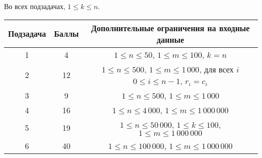 Во всех подзадачах, $1 \le k \le n$.

\begin{center}
\renewcommand{\arraystretch}{1.5}
\begin{tabular}{|c|c|c|}
\hline
Подзадача & Баллы & Дополнительные ограничения на входные данные\\
\hline
1 & 4 & $1 \le n \le 50$, $1 \le m \le 100$, $k = n$ \\
\hline
2 & 12 & $1 \le n \le 500$, $1 \le m \le 1\,000$, для всех $i$ $0 \le i \le n - 1$, $r_i = c_i$ \\
\hline
3 & 9 & $1 \le n \le 500$, $1 \le m \le 1\,000$ \\
\hline
4 & 16 & $1 \le n \le 4\,000$, $1 \le m \le 1\,000\,000$ \\
\hline
5 & 19 & $1 \le n \le 50\,000$, $1 \le k \le 100$, $1 \le m \le 1\,000\,000$ \\
\hline
6 & 40 & $1 \le n \le 100\,000$, $1 \le m \le 1\,000\,000$ \\
\hline
\end{tabular}
\end{center}